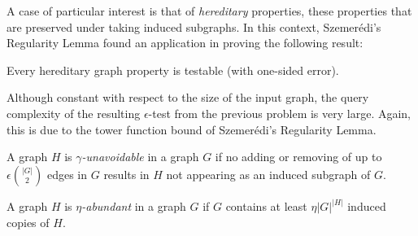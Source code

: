     A case of particular interest is that of \emph{hereditary} properties, these properties that are preserved under
    taking induced subgraphs.
    In this context, Szemer\'edi's Regularity Lemma found an application in proving the following result:

    \begin{theorem}
        Every hereditary graph property is testable (with one-sided error).
    \end{theorem}

    Although constant with respect to the size of the input graph, the query complexity of the resulting $\epsilon$-test
    from the previous problem is very large.
    Again, this is due to the tower function bound of Szemer\'edi's Regularity Lemma.

    \jojo

    \begin{definition} \label{def:unavoidable}
        A graph $H$ is \emph{$\gamma$-unavoidable} in a graph $G$ if no adding or removing of up to $\epsilon {|G| \choose 2}$
        edges in $G$ results in $H$ not appearing as an induced subgraph of $G$.
    \end{definition}

    \begin{definition} \label{def:abundant}
        A graph $H$ is \emph{$\eta$-abundant} in a graph $G$ if $G$ contains at least $\eta |G|^{|H|}$
        induced copies of $H$.
    \end{definition}

